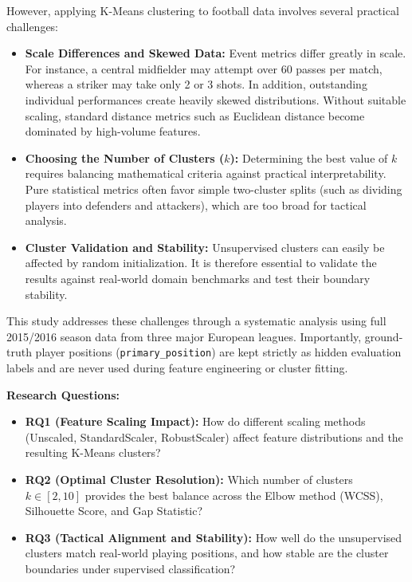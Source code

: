 \documentclass[12pt]{ai_conquer2026}
\begin{document}
However, applying K-Means clustering \cite{macqueen1967methods} to football data involves several practical challenges:
\begin{itemize}
  \item \textbf{Scale Differences and Skewed Data:} Event metrics differ greatly in scale. For instance, a central midfielder may attempt over 60 passes per match, whereas a striker may take only 2 or 3 shots. In addition, outstanding individual performances create heavily skewed distributions. Without suitable scaling, standard distance metrics such as Euclidean distance become dominated by high-volume features.
  \item \textbf{Choosing the Number of Clusters ($k$):} Determining the best value of $k$ requires balancing mathematical criteria against practical interpretability. Pure statistical metrics often favor simple two-cluster splits (such as dividing players into defenders and attackers), which are too broad for tactical analysis.
  \item \textbf{Cluster Validation and Stability:} Unsupervised clusters can easily be affected by random initialization. It is therefore essential to validate the results against real-world domain benchmarks and test their boundary stability.
\end{itemize}

This study addresses these challenges through a systematic analysis using full 2015/2016 season data from three major European leagues. Importantly, ground-truth player positions (\texttt{primary\_position}) are kept strictly as hidden evaluation labels and are never used during feature engineering or cluster fitting.

\textbf{Research Questions:}
\begin{itemize}
  \item \textbf{RQ1 (Feature Scaling Impact):} How do different scaling methods (Unscaled, StandardScaler, RobustScaler) affect feature distributions and the resulting K-Means clusters?
  \item \textbf{RQ2 (Optimal Cluster Resolution):} Which number of clusters $k \in [2, 10]$ provides the best balance across the Elbow method (WCSS), Silhouette Score, and Gap Statistic?
  \item \textbf{RQ3 (Tactical Alignment and Stability):} How well do the unsupervised clusters match real-world playing positions, and how stable are the cluster boundaries under supervised classification?
\end{itemize}
\end{document}
